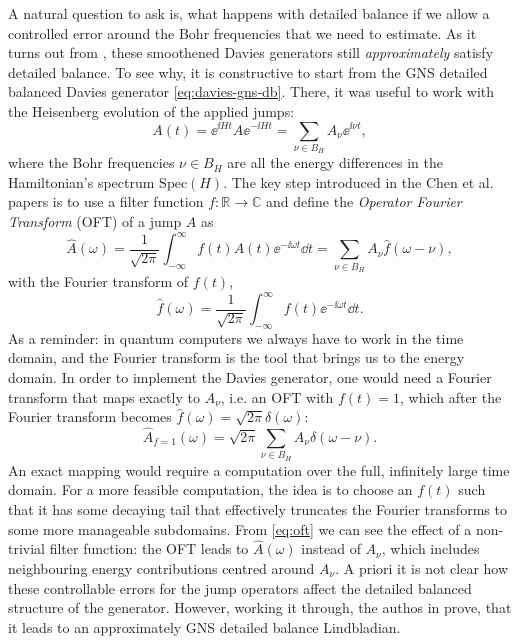 A natural question to ask is, what happens with detailed balance if we allow a controlled error around the Bohr frequencies that we need to estimate. As it turns out from \cite{chen2023quantum}, these smoothened Davies generators still \textit{approximately} satisfy detailed balance. To see why, it is constructive to start from the GNS detailed balanced Davies generator \eqref{eq:davies-gns-db}. There, it was useful to work with the Heisenberg evolution of the applied jumps:
$$
    A(t) = \ee^{\ii Ht} A \ee^{-\ii Ht} = \sum_{\nu\in B_H} A_\nu \ee^{\ii \nu t},
$$
where the Bohr frequencies $\nu\in B_H$ are all the energy differences in the Hamiltonian's spectrum $\text{Spec}(H)$. The key step introduced in the Chen et al. papers is to use a filter function $f: \mathbb{R}\rightarrow \mathbb{C}$ and define the \textit{Operator Fourier Transform} (OFT) of a jump $A$ as
\begin{equation}
    \label{eq:oft}
    \hat{A}(\omega) = \frac{1}{\sqrt{2\pi}} \int_{-\infty}^{\infty} f(t) A(t) \ee^{-\ii \omega t} \dd t = \sum_{\nu \in B_H} A_\nu \hat{f}(\omega - \nu),
\end{equation}
with the Fourier transform of $f(t)$,
$$
    \hat{f}(\omega) = \frac{1}{\sqrt{2\pi}} \int_{-\infty}^{\infty} f(t) \ee^{-\ii \omega t} \dd t.
$$
As a reminder: in quantum computers we always have to work in the time domain, and the Fourier transform is the tool that brings us to the energy domain. In order to implement the Davies generator, one would need a Fourier transform that maps exactly to $A_\nu$, i.e. an OFT with $f(t) = 1$, which after the Fourier transform becomes $\hat{f}(\omega) = \sqrt{2\pi} \delta(\omega)$:
\begin{equation}
    \hat{A}_{f=1}(\omega) = \sqrt{2\pi}\sum_{\nu \in B_H} A_\nu \delta(\omega - \nu).
\end{equation}
An exact mapping would require a computation over the full, infinitely large time domain. For a more feasible computation, the idea is to choose an $f(t)$ such that it has some decaying tail that effectively truncates the Fourier transforms to some more manageable subdomains. From \eqref{eq:oft} we can see the effect of a non-trivial filter function: the OFT leads to $\hat{A}(\omega)$ instead of $A_\nu$, which includes neighbouring energy contributions centred around $A_\nu$. A priori it is not clear how these controllable errors for the jump operators affect the detailed balanced structure of the generator. However, working it through, the authos in \cite{chen2023quantum} prove, that it leads to an approximately GNS detailed balance Lindbladian. 

